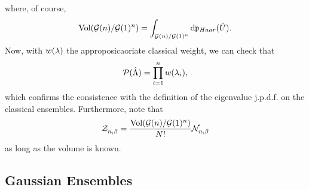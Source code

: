 where, of course,
\begin{equation}
 \operatorname{Vol}(\mathcal{G}(n)/\mathcal{G}(1)^n) = \int_{\mathcal{G}(n)/\mathcal{G}(1)^n} \mathrm{d} \mathfrak{p}_{Haar}(\hat U).
\end{equation}
Now, with $w(\lambda)$ the approposicaoriate classical weight, we can check that
$$\mathcal{P}(\hat\Lambda) = \prod_{i=1}^n w(\lambda_i),$$ which confirms the consistence with the definition of the eigenvalue j.p.d.f. on the classical ensembles. Furthermore, note that
\begin{equation}
	\mathcal{Z}_{n,\beta}^{} = \frac{\operatorname{Vol}(\mathcal{G}(n)/\mathcal{G}(1)^n)}{N!} \mathcal{N}_{n,\beta}^{}
\end{equation}
as long as the volume is known.

\subsection{Gaussian Ensembles}

